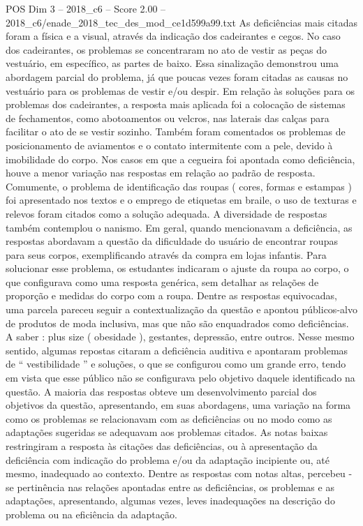 \begin{textsample}{POS Dim 3 – 2018\_c6 – Score 2.00 – 2018\_c6/enade\_2018\_tec\_des\_mod\_ce1d599a99.txt}
As deficiências mais citadas foram a física e a visual, através da indicação dos cadeirantes e cegos.
No caso dos cadeirantes, os problemas se concentraram no ato de vestir as peças do vestuário, em específico, as partes de baixo.
Essa sinalização demonstrou uma abordagem parcial do problema, já que poucas vezes foram citadas as causas no vestuário para os problemas de vestir e/ou despir.
Em relação às soluções para os problemas dos cadeirantes, a resposta mais aplicada foi a colocação de sistemas de fechamentos, como abotoamentos ou velcros, nas laterais das calças para facilitar o ato de se vestir sozinho.
Também foram comentados os problemas de posicionamento de aviamentos e o contato intermitente com a pele, devido à imobilidade do corpo.
Nos casos em que a cegueira foi apontada como deficiência, houve a menor variação nas respostas em relação ao padrão de resposta.
Comumente, o problema de identificação das roupas ( cores, formas e estampas ) foi apresentado nos textos e o emprego de etiquetas em braile, o uso de texturas e relevos foram citados como a solução adequada.
A diversidade de respostas também contemplou o nanismo.
Em geral, quando mencionavam a deficiência, as respostas abordavam a questão da dificuldade do usuário de encontrar roupas para seus corpos, exemplificando através da compra em lojas infantis.
Para solucionar esse problema, os estudantes indicaram o ajuste da roupa ao corpo, o que configurava como uma resposta genérica, sem detalhar as relações de proporção e medidas do corpo com a roupa.
Dentre as respostas equivocadas, uma parcela pareceu seguir a contextualização da questão e apontou públicos-alvo de produtos de moda inclusiva, mas que não são enquadrados como deficiências.
A saber : plus size ( obesidade ), gestantes, depressão, entre outros.
Nesse mesmo sentido, algumas repostas citaram a deficiência auditiva e apontaram problemas de “ vestibilidade ” e soluções, o que se configurou como um grande erro, tendo em vista que esse público não se configurava pelo objetivo daquele identificado na questão.
A maioria das respostas obteve um desenvolvimento parcial dos objetivos da questão, apresentando, em suas abordagens, uma variação na forma como os problemas se relacionavam com as deficiências ou no modo como as adaptações sugeridas se adequavam aos problemas citados.
As notas baixas restringiram a resposta às citações das deficiências, ou à apresentação da deficiência com indicação do problema e/ou da adaptação incipiente ou, até mesmo, inadequado ao contexto.
Dentre as respostas com notas altas, percebeu -se pertinência nas relações apontadas entre as deficiências, os problemas e as adaptações, apresentando, algumas vezes, leves inadequações na descrição do problema ou na eficiência da adaptação.

\end{textsample}
